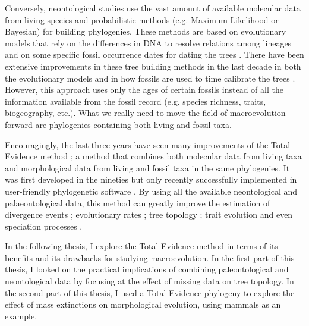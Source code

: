 Conversely, neontological studies use the vast amount of available molecular data from living species and probabilistic methods (e.g. Maximum Likelihood or Bayesian) for building phylogenies.
These methods are based on evolutionary models that rely on the differences in DNA to resolve relations among lineages and on some specific fossil occurrence dates for dating the trees \citep[i.e. the molecular clock;][]{zuckerkandl1965}.
There have been extensive improvements in these tree building methods in the last decade in both the evolutionary models \citep[e.g.][]{bapsta2013,stadlerdating2013,heaththe2013} and in how fossils are used to time calibrate the trees \citep{Donoghue2007424,Parham01032012}.
However, this approach uses only the ages of certain fossils instead of all the information available from the fossil record (e.g. species richness, traits, biogeography, etc.).
What we really need to move the field of macroevolution forward are phylogenies containing both living and fossil taxa.

Encouragingly, the last three years have seen many improvements of the Total Evidence method \citep{ronquista2012,slaterphylogenetic2013,Wood01032013,schragocombining2013,beckancient2014,Arcila2015131,Dembo2015}; a method that combines both molecular data from living taxa and morphological data from living and fossil taxa in the same phylogenies.
It was first developed in the nineties \citep{eernissetaxonomic1993} but only recently successfully implemented in user-friendly phylogenetic software \citep{Ronquist2012mrbayes,BEAST2}.
By using all the available neontological and palaeontological data, this method can greatly improve the estimation of divergence events \citep[e.g.][]{ronquista2012}; evolutionary rates \citep[e.g.][]{beckancient2014}; tree topology \citep[e.g.][]{Dembo2015}; trait evolution \citep[e.g.][]{slaterphylogenetic2013} and even speciation processes \citep[e.g.][]{Wood01032013}.



In the following thesis, I explore the Total Evidence method in terms of its benefits and its drawbacks for studying macroevolution.
In the first part of this thesis, I looked on the practical implications of combining paleontological and neontological data by focusing at the effect of missing data on tree topology.
In the second part of this thesis, I used a Total Evidence phylogeny to explore the effect of mass extinctions on morphological evolution, using mammals as an example.

